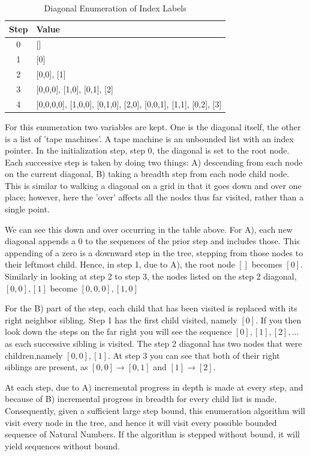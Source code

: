 \documentclass{article}
\begin{document}
   	
   \begin{table}[H]
   	\centering
   	\begin{tabular}{c | l}
   		\toprule
   		Step & Value \\
   		\midrule
   		0 & [] \\
   		1 & [0] \\
   		2 & [0,0], [1] \\
   		3 & [0,0,0], [1,0], [0,1], [2] \\
   		4 & [0,0,0,0], [1,0,0], [0,1,0], [2,0], [0,0,1], [1,1], [0,2], [3] \\
   		\bottomrule
   	\end{tabular}
   	\caption{Diagonal Enumeration of Index Labels}
   	\label{tab:label_arguments}
   \end{table}
 
	
	For this enumeration two variables are kept.  One is the diagonal itself, the other is a list of 'tape machines'.   A tape machine is an unbounded list with an index pointer.  In the initialization step, step \( 0 \), the diagonal is set to the root node. Each successive step is taken by doing two things:  A) descending from each node on the current diagonal, B) taking a breadth step from each node child node.  This is similar to walking a diagonal on a grid in that it goes down and over one place; however, here the 'over' affects all the nodes thus far visited, rather than a single point.
	
	We can see this down and over occurring in the table above.  For A), each new diagonal appends a \( 0 \) to the sequences of the prior step and includes those. This appending of a zero is a downward step in the tree, stepping from those nodes to their leftmost child. Hence, in step 1, due to A),  the root node \( [] \) becomes \( [0] \). Similarly in looking at step 2 to step 3, the nodes listed on the step 2 diagonal,  \( [0,0], [1] \)  become \( [0,0,0], [1,0] \)
	
	For the B) part of the step, each child that has been visited is replaced with its right neighbor sibling. Step 1 has the first child visited, namely \( [0] \). If you then look down the steps on the far right you will see the sequence \([0], [1], [2], ...\) as each successive sibling is visited. The step 2 diagonal has two nodes that were children,namely \( [0,0], [1] \). At step 3 you can see that both of their right siblings are present, as \( [0,0]  \rightarrow [0,1] \) and \( [1] \rightarrow [2] \).
	
	At each step, due to A) incremental progress in depth is made at every step, and because of B) incremental progress in breadth for every child list is made.  Consequently, given a sufficient large step bound, this enumeration algorithm will visit every node in the tree, and hence it will visit every possible bounded sequence of Natural Numbers. If the algorithm is stepped without bound, it will yield sequences without bound.
	
\end{document}
